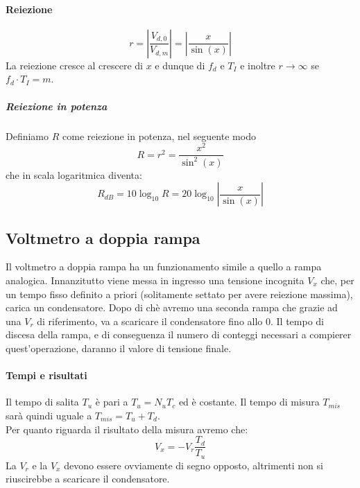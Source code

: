 \documentclass{article}
\begin{document}
	\paragraph*{Reiezione}
	\begin{equation}
		r = \left| \frac{V_{d,0}}{V_{d,m}} \right| = \left| \frac{x}{\sin(x)} \right|
	\end{equation}
	La reiezione cresce al crescere di $x$ e dunque di $f_d$ e $T_I$ e inoltre $r \to \infty$ se $f_d \cdot T_I = m$.
	\subparagraph*{Reiezione in potenza}
	Definiamo $R$ come reiezione in potenza, nel seguente modo
	\begin{equation}
		R = r^2 = \frac{x^2}{\sin^2(x)}
	\end{equation}
	che in scala logaritmica diventa:
	\begin{equation}
		R_{dB} = 10\log_{10}R = 20\log_{10} \left|\frac{x}{\sin(x)}\right|
	\end{equation}
	\subsection*{Voltmetro a doppia rampa}
	Il voltmetro a doppia rampa ha un funzionamento simile a quello a rampa analogica. Innanzitutto viene messa in ingresso una tensione incognita $V_x$ che, per un tempo fisso definito a priori (solitamente settato per avere reiezione massima), carica un condensatore. Dopo di chè avremo una seconda rampa che grazie ad una $V_r$ di riferimento, va a scaricare il condensatore fino allo 0. Il tempo di discesa della rampa, e di conseguenza il numero di conteggi necessari a compierer quest'operazione, daranno il valore di tensione finale.
	\paragraph*{Tempi e risultati}
	Il tempo di salita $T_u$ è pari a $T_u = N_uT_c$ ed è costante.
	Il tempo di misura $T_{mis}$ sarà quindi uguale a $T_{mis} = T_u + T_d$.\\
	Per quanto riguarda il risultato della misura avremo che:
	\begin{equation}
		V_x = -V_r\frac{T_d}{T_u}
	\end{equation}
	La $V_r$ e la $V_x$ devono essere ovviamente di segno opposto, altrimenti non si riuscirebbe a scaricare il condensatore.
\end{document}
